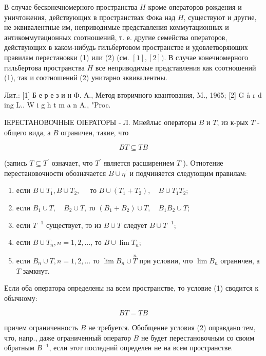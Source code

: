 \documentclass[10pt]{article}
\begin{document}
В случае бесконечномерного пространства $H$ кроме операторов рождения и уничтожения, действующих в пространствах Фока над $H$, существуют и другие, не эквивалентные им, неприводимые представления коммутационных и антикоммутационных соотношений, т. е. другие семейства операторов, действующих в каком-нибудь гильбертовом пространстве и удовлетворяющих правилам перестановки (1) или (2) (см. $[1],[2])$. В случае конечномерного гильбертова пространства $H$ все неприводимые представления как соотношений (1), так и соотношений (2) унитарно эквивалентны.

Лит.: [1] Б е р е з и н Ф. А., Метод вторичного квантования, M., 1965; [2] G å r d ing L.. W i g h t m a n A., "Proc.

IЕРЕСТАНОВОЧНЫЕ ОIЕРАТОРЫ - Л. Мнейлыс операторы $B$ и $T$, из к-рых $T$ - общего вида, а $B$ ограничен, такие, что

\[
B T \subseteq T B
\]

(запись $T \subseteq T^{\prime}$ означает, что $T^{\prime}$ является расширением $T$ ). Отнотение перестановочности обозначается $B \cup \eta^{\prime}$ и подчиняется следующим правилам:

\begin{enumerate}
  \item если $B \cup T_{1}, B \cup T_{2}, \quad$ то $B \cup\left(T_{1}+T_{2}\right), \quad B \cup T_{1} T_{2}$;

  \item если $B_{1} \cup T, \quad B_{2} \cup T$, то $\left(B_{1}+B_{2}\right) \cup T, \quad B_{1} B_{2} \cup T$;

  \item если $T^{-1}$ существует, то из $B \cup T$ следует $B \cup T^{-1}$;

  \item если $B \cup T_{n}, n=1,2, \ldots$, то $B \cup \lim T_{n}$;

  \item если $B_{n} \cup T, n=1,2, \ldots$ то $\lim B_{n} \cup \stackrel{n}{T}$ при условии, что $\lim B_{n}$ ограничен, а $T$ замкнут.

\end{enumerate}

Если оба оператора определены на всем пространстве, то условие (1) сводится к обычному:

\[
B T=T B
\]

причем ограниченность $B$ не требуется. Обобщение условия (2) оправдано тем, что, напр., даже ограниченный оператор $B$ не будет перестановочным со своим обратным $B^{-1}$, если этот последний определен не на всем пространстве.
\end{document}
